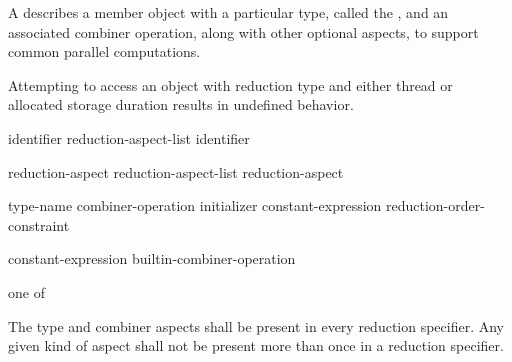 
\pnum
A
describes a member object with a particular type,
called the
,
and an associated combiner operation,
along with other optional aspects,
to support common parallel computations.

\pnum
Attempting to access an object with reduction type
and either thread or allocated storage duration
results in undefined behavior.


\begin{bnf}
\br
{} identifier\opt{} \terminal{\{} reduction-aspect-list \terminal{\}}
\br
{} identifier
\end{bnf}

\begin{bnf}
\br
reduction-aspect
\br
reduction-aspect-list \terminal{,} reduction-aspect
\end{bnf}

\begin{bnf}
\br
{} \terminal{:} type-name
\br
{} \terminal{:} combiner-operation
\br
{} \terminal{:} initializer
\br
{} \terminal{:} constant-expression
\br
{} \terminal{:} reduction-order-constraint
\end{bnf}

\begin{bnf}
\br
constant-expression
\br
builtin-combiner-operation
\end{bnf}

\begin{bnf}
\textnormal{one of}
\br
\terminal{*=} \terminal{+=}
\br
\terminal{\&=} \terminal{\textasciicircum=} \terminal{|=}
\br
{} 
\br
{} 
\br
{}
\end{bnf}

\begin{bnf}
\br
{}
\br
{}
\end{bnf}


\pnum
The type and combiner aspects shall be present in every reduction specifier.
Any given kind of aspect shall not be present more than once
in a reduction specifier. 

